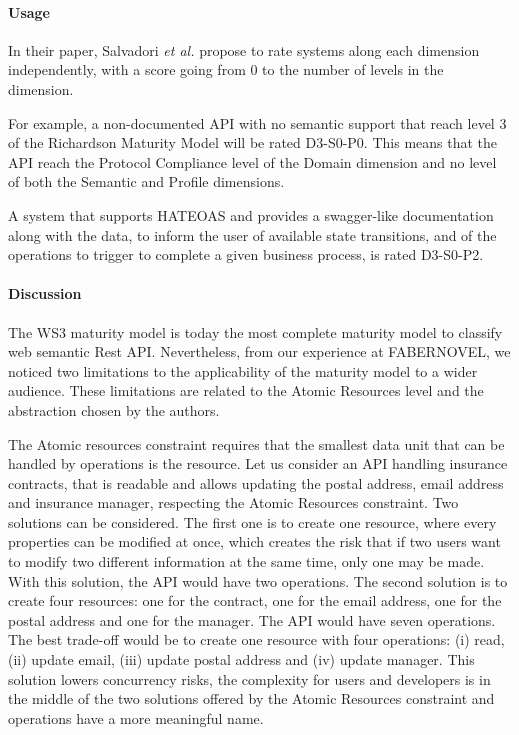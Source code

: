 \paragraph{Usage}

In their paper, Salvadori \emph{et al.} propose to rate systems along each dimension independently, with a score going from 0 to the number of levels in the dimension.

For example, a non-documented API with no semantic support that reach level 3 of the Richardson Maturity Model will be rated D3-S0-P0. This means that the API reach the Protocol Compliance level of the Domain dimension and no level of both the Semantic and Profile dimensions.


A system that supports HATEOAS and provides a swagger-like documentation along with the data, to inform the user of available state transitions, and of the operations to trigger to complete a given business process, is rated D3-S0-P2.

\paragraph{Discussion}

The WS3 maturity model is today the most complete maturity model to classify web semantic Rest API. Nevertheless, from our experience at FABERNOVEL, we noticed two limitations to the applicability of the maturity model to a wider audience. These limitations are related to the Atomic Resources level and the abstraction chosen by the authors.

The Atomic resources constraint requires that the smallest data unit that can be handled by operations is the resource. Let us consider an API handling insurance contracts, that is readable and allows updating the postal address, email address and insurance manager, respecting the Atomic Resources constraint.  Two solutions can be considered. The first one is to create one resource, where every properties can be modified at once, which creates the risk that if two users want to modify two different information at the same time, only one may be made. With this solution, the API would have two operations. The second solution is to create four resources: one for the contract, one for the email address, one for the postal address and one for the manager. The API would have seven operations. The best trade-off would be to create one resource with four operations: (i) read, (ii) update email, (iii) update postal address and (iv) update manager. This solution lowers concurrency risks, the complexity for users and developers is in the middle of the two solutions offered by the Atomic Resources constraint and operations have a more meaningful name.

